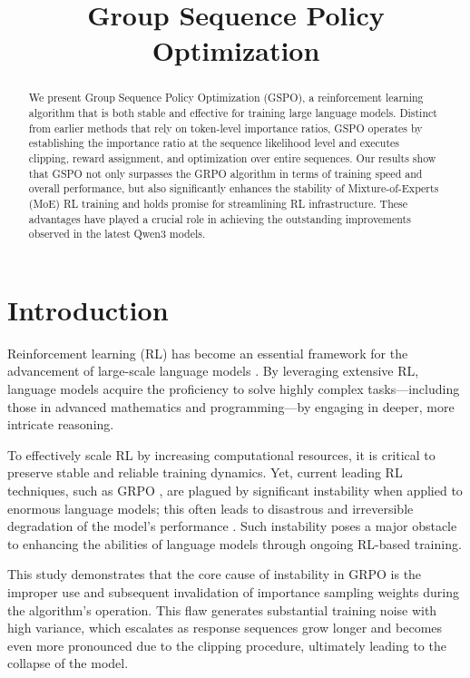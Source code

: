 \title{Group Sequence Policy Optimization}

\begin{abstract}
We present Group Sequence Policy Optimization (GSPO), a reinforcement learning algorithm that is both stable and effective for training large language models. Distinct from earlier methods that rely on token-level importance ratios, GSPO operates by establishing the importance ratio at the sequence likelihood level and executes clipping, reward assignment, and optimization over entire sequences. Our results show that GSPO not only surpasses the GRPO algorithm in terms of training speed and overall performance, but also significantly enhances the stability of Mixture-of-Experts (MoE) RL training and holds promise for streamlining RL infrastructure. These advantages have played a crucial role in achieving the outstanding improvements observed in the latest Qwen3 models.
\end{abstract}

\section{Introduction}
\label{sec:intro}

Reinforcement learning (RL) has become an essential framework for the advancement of large-scale language models \citep{o1,dpsk-r1,qwq32b,qwen3}. By leveraging extensive RL, language models acquire the proficiency to solve highly complex tasks—including those in advanced mathematics and programming—by engaging in deeper, more intricate reasoning.

To effectively scale RL by increasing computational resources, it is critical to preserve stable and reliable training dynamics. Yet, current leading RL techniques, such as GRPO \citep{grpo}, are plagued by significant instability when applied to enormous language models; this often leads to disastrous and irreversible degradation of the model’s performance \citep{qwen3, minimax-m1}. Such instability poses a major obstacle to enhancing the abilities of language models through ongoing RL-based training.

This study demonstrates that the core cause of instability in GRPO is the improper use and subsequent invalidation of importance sampling weights during the algorithm's operation. This flaw generates substantial training noise with high variance, which escalates as response sequences grow longer and becomes even more pronounced due to the clipping procedure, ultimately leading to the collapse of the model.

